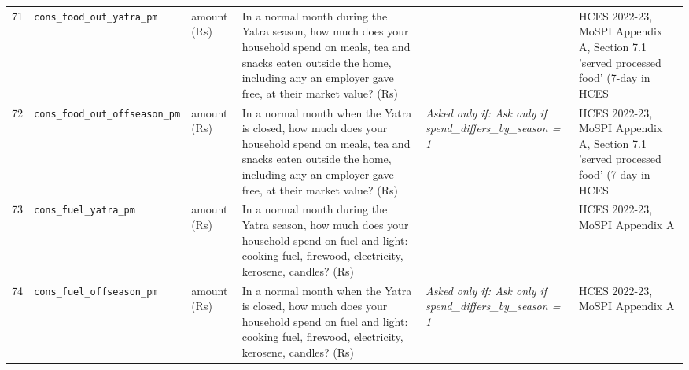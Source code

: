 \documentclass[9pt,a4paper,landscape]{article}
\begin{document}
\begin{longtable}{@{}p{0.5cm}p{3.3cm}p{1.7cm}p{7.3cm}p{5.6cm}p{5.4cm}@{}}
\footnotesize 71 & \footnotesize\texttt{cons\_food\_out\_yatra\_pm} & \scriptsize amount (Rs) & \footnotesize In a normal month during the Yatra season, how much does your household spend on meals, tea and snacks eaten outside the home, including any an employer gave free, at their market value? (Rs)\par\vspace{1pt}{\footnotesize\color{hdr}{\hifont यात्रा के मौसम के आम महीने में, आप (और जो यहाँ आपके साथ रहते हैं) बाहर खाए गए खाने, चाय और नाश्ते पर, मालिक ने मुफ़्त दिया हो तो उसकी क़ीमत मिलाकर कितना ख़र्च करते हैं? (रुपये)}} & \scriptsize  & \scriptsize HCES 2022-23, MoSPI Appendix A, Section 7.1 'served processed food' (7-day in HCES\\
\footnotesize 72 & \footnotesize\texttt{cons\_food\_out\_offseason\_pm} & \scriptsize amount (Rs) & \footnotesize In a normal month when the Yatra is closed, how much does your household spend on meals, tea and snacks eaten outside the home, including any an employer gave free, at their market value? (Rs)\par\vspace{1pt}{\footnotesize\color{hdr}{\hifont जब यात्रा बंद रहती है, उस आम महीने में आपका घर बाहर खाए गए खाने, चाय और नाश्ते पर, मालिक ने मुफ़्त दिया हो तो उसकी क़ीमत मिलाकर कितना ख़र्च करता है? (रुपये)}} & \scriptsize \textit{Asked only if: Ask only if spend\_differs\_by\_season = 1} & \scriptsize HCES 2022-23, MoSPI Appendix A, Section 7.1 'served processed food' (7-day in HCES\\
\footnotesize 73 & \footnotesize\texttt{cons\_fuel\_yatra\_pm} & \scriptsize amount (Rs) & \footnotesize In a normal month during the Yatra season, how much does your household spend on fuel and light: cooking fuel, firewood, electricity, kerosene, candles? (Rs)\par\vspace{1pt}{\footnotesize\color{hdr}{\hifont यात्रा के मौसम के आम महीने में, आप (और जो यहाँ आपके साथ रहते हैं) ईंधन और रोशनी पर: खाना बनाने की गैस, लकड़ी, बिजली, मिट्टी का तेल, मोमबत्ती कितना ख़र्च करते हैं? (रुपये)}} & \scriptsize  & \scriptsize HCES 2022-23, MoSPI Appendix A\\
\footnotesize 74 & \footnotesize\texttt{cons\_fuel\_offseason\_pm} & \scriptsize amount (Rs) & \footnotesize In a normal month when the Yatra is closed, how much does your household spend on fuel and light: cooking fuel, firewood, electricity, kerosene, candles? (Rs)\par\vspace{1pt}{\footnotesize\color{hdr}{\hifont जब यात्रा बंद रहती है, उस आम महीने में आपका घर ईंधन और रोशनी पर: खाना बनाने की गैस, लकड़ी, बिजली, मिट्टी का तेल, मोमबत्ती कितना ख़र्च करता है? (रुपये)}} & \scriptsize \textit{Asked only if: Ask only if spend\_differs\_by\_season = 1} & \scriptsize HCES 2022-23, MoSPI Appendix A\\

\end{longtable}
\end{document}

